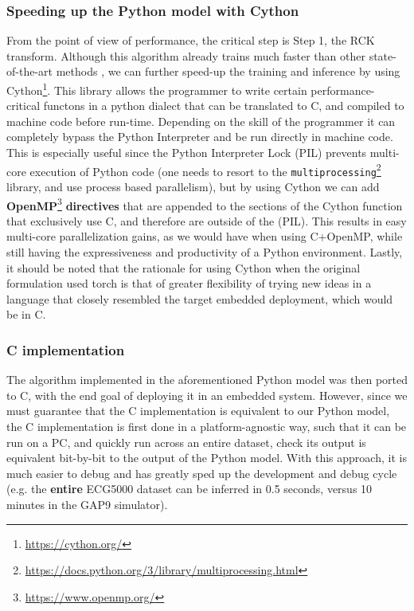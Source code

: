     \subsubsection{Speeding up the Python model with Cython}
    From the point of view of performance, the critical step is Step 1, the RCK transform. Although this algorithm already trains much faster than other state-of-the-art methods \cite{Dempster2023Hydra},
    we can further speed-up the training and inference by using Cython\footnote{\href{https://cython.org/}{https://cython.org/}}. This library allows the programmer to write certain performance-critical functons
    in a python dialect that can be translated to C, and compiled to machine code before run-time. Depending on the skill of the programmer it can completely bypass the Python Interpreter and be run directly in machine code.
    This is especially useful since the Python Interpreter Lock (PIL) prevents multi-core execution of Python code (one needs to resort to the \verb|multiprocessing|\footnote{\href{https://docs.python.org/3/library/multiprocessing.html}{https://docs.python.org/3/library/multiprocessing.html}} library, and use process
    based parallelism), but by using Cython we can add \textbf{OpenMP}\footnote{\href{https://www.openmp.org/}{https://www.openmp.org/}} \textbf{directives} that are appended to the sections of the Cython function that exclusively use C, and therefore are outside of the (PIL). This results
    in easy multi-core parallelization gains, as we would have when using C+OpenMP, while still having the expressiveness and productivity of a Python environment. Lastly, it should be noted that the rationale for using Cython when the original
    formulation used torch is that of greater flexibility of trying new ideas in a language that closely resembled the target embedded deployment, which would be in C.

    \subsubsection{C implementation}
    The algorithm implemented in the aforementioned Python model was then ported to C, with the end goal of deploying it in an embedded system. 
    However, since we must guarantee that the C implementation is equivalent to our Python model, the C implementation is first done in a platform-agnostic way,
    such that it can be run on a PC, and quickly run across an entire dataset, check its output is equivalent bit-by-bit to the output of the Python model. With this approach, 
    it is much easier to debug and has greatly sped up the development and debug cycle (e.g. the \textbf{entire} ECG5000 dataset can be inferred in 0.5 seconds, versus 10 minutes in the GAP9 simulator).
    
